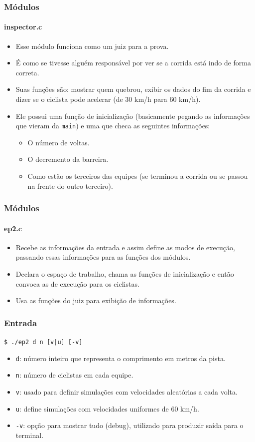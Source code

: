 \documentclass{beamer}
\begin{document}
\begin{frame}
	\frametitle{Módulos}
	\framesubtitle{inspector.c}
	\begin{itemize}
		\item Esse módulo funciona como um juiz para a prova.
		\item É como se tivesse alguém responsável por ver se a corrida está indo de forma correta.
		\item Suas funções são: mostrar quem quebrou, exibir os dados do fim da corrida e dizer se o ciclista pode acelerar (de 30 km/h para 60 km/h).
		\item Ele possui uma função de inicialização (basicamente pegando as informações que vieram da \texttt{main}) e uma que checa as seguintes informações:
		\begin{itemize}
			\item O número de voltas.
			\item O decremento da barreira.
			\item Como estão os terceiros das equipes (se terminou a corrida ou se passou na frente do outro terceiro).
		\end{itemize}
	\end{itemize}	
\end{frame}

\begin{frame}
	\frametitle{Módulos}
	\framesubtitle{ep2.c}
	\begin{itemize}
		\item Recebe as informações da entrada e assim define as modos de execução, passando essas informações para as funções dos módulos.
		\item Declara o espaço de trabalho, chama as funções de inicialização e então convoca as de execução para os ciclistas.
		\item Usa as funções do juiz para exibição de informações.
	\end{itemize}	
\end{frame}

\begin{frame}
	\frametitle{Entrada}
	\begin{center}
		\texttt{\$ ./ep2 d n [v|u] [-v]}
	\end{center}	
	\begin{itemize}
		\item \texttt{d}: número inteiro que representa o comprimento em metros da pista.
		\item \texttt{n}: número de ciclistas em cada equipe. 
		\item \texttt{v}: usado para definir simulações com velocidades aleatórias a cada volta. 
		\item \texttt{u}: define simulações com velocidades uniformes de 60 km/h.  
		\item \texttt{-v}: opção para mostrar tudo (debug), utilizado para produzir saída para o terminal. 
	\end{itemize} 
\end{frame}
\end{document}
